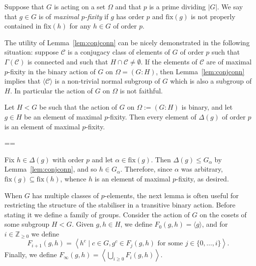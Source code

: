 \documentclass[11pt, a4paper]{amsart}
\makeatletter
\newcommand\fix{\mathrm{fix}}
\renewcommand{\proofname}{Proof}
\renewenvironment{proof}[1][\proofname]{\par
  \pushQED{\qed}  \normalfont \partopsep=\z@skip \topsep=\z@skip
  \trivlist
  \item[\hskip\labelsep
        \scshape
    #1\@addpunct{.}]\ignorespaces
}{  \popQED\endtrivlist\@endpefalse
}
\makeatother
\begin{document}
Suppose that $G$ is acting on a set $\Omega$ and that $p$ is a prime dividing $|G|$. We say that $g\in G$ is of \emph{maximal $p$-fixity} if $g$ has order $p$ and $\mathrm{fix}(g)$ is not properly contained in $\mathrm{fix}(h)$ for any $h\in G$ of order $p$.



      
The utility of Lemma~\ref{lem:conjconn} can be nicely demonstrated in the following situation: suppose $\mathcal{C}$ is a conjugacy class of elements of $G$ of order $p$ such that $\Gamma(\mathcal{C})$ is connected and such that $H\cap\mathcal{C}\ne\emptyset$. If the elements of $\mathcal{C}$ are of maximal $p$-fixity in the binary action of $G$ on $\Omega=(G:H)$, then Lemma~\ref{lem:conjconn} implies that $\langle\mathcal{C}\rangle$ is a non-trivial normal subgroup of $G$ which is also a subgroup of $H$. In particular the action of $G$ on $\Omega$ is not faithful.

\begin{lemma}\label{lem:maxfixdelta}
    Let $H<G$ be such that the action of $G$ on $\Omega:=(G:H)$ is binary, and let $g\in H$ be an element of maximal $p$-fixity. Then every element of $\Delta(g)$ of order $p$ is an element of maximal $p$-fixity.
\end{lemma}
\begin{proof}
    Fix $h\in\Delta(g)$ with order $p$ and let $\alpha\in \fix(g)$. Then $\Delta(g)\leq G_\alpha$ by Lemma~\ref{lem:conjconn}, and so $h\in G_\alpha$. Therefore, since $\alpha$ was arbitrary, $\fix(g)\subseteq\fix(h)$, whence $h$ is an element of maximal $p$-fixity, as desired.
\end{proof}


When $G$ has multiple classes of $p$-elements, the next lemma is often useful for restricting the structure of the stabiliser in a transitive binary action. Before stating it we define a family of groups. Consider the action of $G$ on the cosets of some subgroup $H<G$. Given $g,h\in H$, we define $F_0(g,h)=\langle g\rangle$, and for $i\in\mathbb{Z}_{\geq 0}$ we define $$F_{i+1}(g,h)=\left\langle h^c \mid c \in G, g^c\in F_j(g,h)\text{ for some } j\in\{0,\dots,i\}\right\rangle.$$ Finally, we define $F_\infty(g,h)=\left\langle\bigcup_{i\geq0} F_i(g,h)\right\rangle.$
\end{document}
